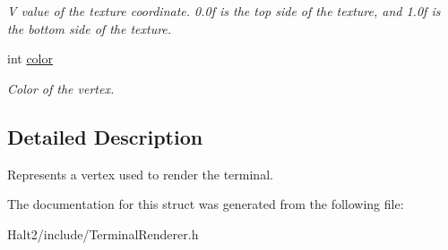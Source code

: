 \begin{DoxyCompactItemize}
\begin{DoxyCompactList}\small\item\em \-V value of the texture coordinate. 0.\-0f is the top side of the texture, and 1.\-0f is the bottom side of the texture. \end{DoxyCompactList}\item 
\hypertarget{structhalt_1_1_terminal_vertex_a4b013191f12b64c5d5d142c48031e100}{int \hyperlink{structhalt_1_1_terminal_vertex_a4b013191f12b64c5d5d142c48031e100}{color}}\label{structhalt_1_1_terminal_vertex_a4b013191f12b64c5d5d142c48031e100}

\begin{DoxyCompactList}\small\item\em \-Color of the vertex. \end{DoxyCompactList}\end{DoxyCompactItemize}


\subsection{\-Detailed \-Description}
\-Represents a vertex used to render the terminal. 

\-The documentation for this struct was generated from the following file\-:\begin{DoxyCompactItemize}
\item 
\-Halt2/include/\-Terminal\-Renderer.\-h\end{DoxyCompactItemize}
